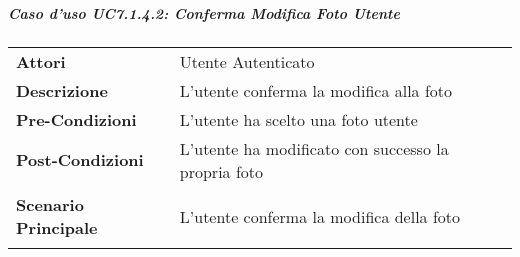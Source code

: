 \subparagraph{Caso d'uso UC7.1.4.2:  Conferma Modifica Foto Utente}
\label{UC7_1_4_2}

\begin{tabular}{ l | p{11cm}}
	\hline
	\rowcolor{Gray}
	 \multicolumn{2}{c}{UC7.1.4.2:  Conferma Modifica Foto Utente} \\
	 \hline
	\textbf{Attori} & Utente Autenticato \\
	\textbf{Descrizione} & L'utente conferma la modifica alla foto\\
	\textbf{Pre-Condizioni} & L'utente ha scelto una foto utente\\
	\textbf{Post-Condizioni} & L'utente ha modificato con successo la propria foto\\
	\textbf{Scenario Principale} & 
	\begin{enumerate*}[label=(\arabic*.),itemjoin={\newline}]
		\item L'utente conferma la modifica della foto
	\end{enumerate*}\\
\end{tabular}